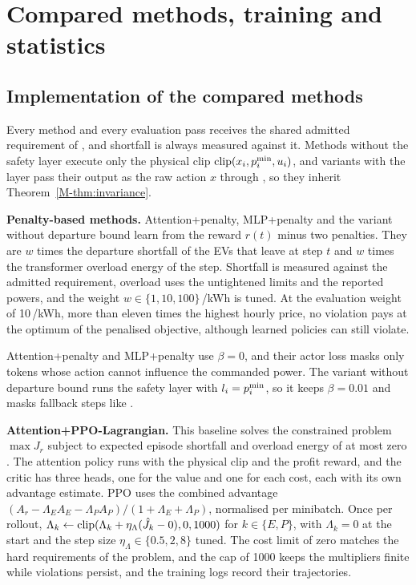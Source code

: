 \section{Compared methods, training and statistics}\label{sec:training-supp}

\subsection{Implementation of the compared methods}\label{app:baselines}

Every method and every evaluation pass receives the shared admitted requirement of , and shortfall is always measured against it.
Methods without the safety layer execute only the physical clip $\operatorname{clip}(x_i,p^{\min}_i,u_i)$, and variants with the layer pass their output as the raw action $x$ through , so they inherit Theorem~\ref{M-thm:invariance}.

\textbf{Penalty-based methods.}
Attention+penalty, MLP+penalty and the variant without departure bound learn from the reward $r(t)$ minus two penalties.
They are $w$ times the departure shortfall of the EVs that leave at step $t$ and $w$ times the transformer overload energy of the step.
Shortfall is measured against the admitted requirement, overload uses the untightened limits and the reported powers, and the weight $w\in\{1,10,100\}$\,\texteuro/kWh is tuned.
At the evaluation weight of 10\,\texteuro/kWh, more than eleven times the highest hourly price, no violation pays at the optimum of the penalised objective, although learned policies can still violate.

Attention+penalty and MLP+penalty use $\beta=0$, and their actor loss masks only tokens whose action cannot influence the commanded power.
The variant without departure bound runs the safety layer with $l_i=p^{\min}_i$, so it keeps $\beta=0.01$ and masks fallback steps like \method{}.

\textbf{Attention+PPO-Lagrangian.}
This baseline solves the constrained problem $\max J_r$ subject to expected episode shortfall and overload energy of at most zero \cite{altman2021constrained,tessler2018reward}.
The attention policy runs with the physical clip and the profit reward, and the critic has three heads, one for the value and one for each cost, each with its own advantage estimate.
PPO uses the combined advantage $(A_r-\Lambda_EA_E-\Lambda_PA_P)/(1+\Lambda_E+\Lambda_P)$, normalised per minibatch.
Once per rollout, $\Lambda_k\gets\operatorname{clip}(\Lambda_k+\eta_\Lambda(\hat J_k-0),0,1000)$ for $k\in\{E,P\}$, with $\Lambda_k=0$ at the start and the step size $\eta_\Lambda\in\{0.5,2,8\}$ tuned.
The cost limit of zero matches the hard requirements of the problem, and the cap of 1000 keeps the multipliers finite while violations persist, and the training logs record their trajectories.

